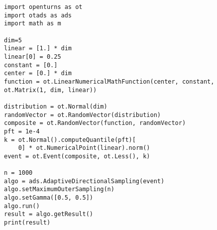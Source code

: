 \begin{lstlisting}
import openturns as ot
import otads as ads
import math as m

dim=5
linear = [1.] * dim
linear[0] = 0.25
constant = [0.]
center = [0.] * dim
function = ot.LinearNumericalMathFunction(center, constant, ot.Matrix(1, dim, linear))

distribution = ot.Normal(dim)
randomVector = ot.RandomVector(distribution)
composite = ot.RandomVector(function, randomVector)
pft = 1e-4
k = ot.Normal().computeQuantile(pft)[
    0] * ot.NumericalPoint(linear).norm()
event = ot.Event(composite, ot.Less(), k)

n = 1000
algo = ads.AdaptiveDirectionalSampling(event)
algo.setMaximumOuterSampling(n)
algo.setGamma([0.5, 0.5])
algo.run()
result = algo.getResult()
print(result)
\end{lstlisting}
